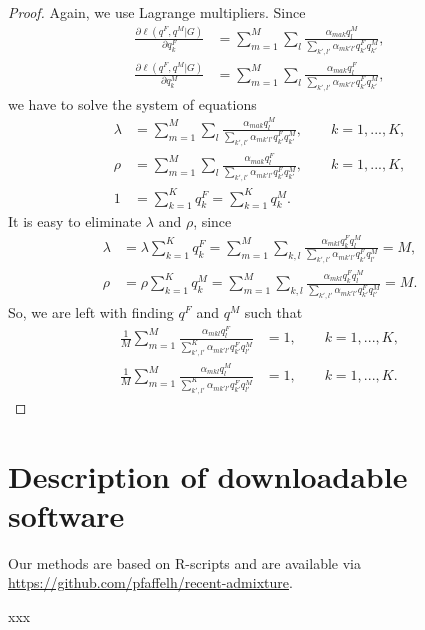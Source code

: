 \documentclass[12pt]{article}
\theoremstyle{definition}
\begin{document}
\begin{proof}
  Again, we use Lagrange multipliers. Since
  \begin{align*}
    \frac{\partial \ell(q^F, q^M|G)}{\partial q^F_k}
    & = \sum_{m=1}^M \sum_l \frac{\alpha_{mak}q_l^M}{\sum_{k',l'} \alpha_{mk'l'}q^F_{k'}q^M_{k'}},
    \\
    \frac{\partial \ell(q^F, q^M|G)}{\partial q^M_k}
    & = \sum_{m=1}^M \sum_l \frac{\alpha_{mak}q_l^F}{\sum_{k',l'} \alpha_{mk'l'}q^F_{k'}q^M_{k'}},
  \end{align*}
  we have to solve the system of equations
  \begin{align}\label{eq:1}
    \lambda & = \sum_{m=1}^M \sum_l \frac{\alpha_{mak}q_l^M}{\sum_{k',l'} \alpha_{mk'l'}q^F_{k'}q^M_{k'}}, \qquad k=1,...,K,\\
    \rho & = \sum_{m=1}^M \sum_l \frac{\alpha_{mak}q_l^F}{\sum_{k',l'} \alpha_{mk'l'}q^F_{k'}q^M_{k'}}, \qquad k=1,...,K,
    \\\label{eq:2}
    1 & = \sum_{k=1}^K q^F_k = \sum_{k=1}^K q^M_k.
  \end{align}
  It is easy to eliminate $\lambda$ and $\rho$, since
  \begin{align*}
    \lambda & = \lambda \sum_{k=1}^K q^F_k = \sum_{m=1}^M \sum_{k,l}
              \frac{\alpha_{mkl}q^F_kq_l^M}{\sum_{k',l'} \alpha_{mk'l'}q^F_{k'}q_{l'}^M} = M,
    \\
    \rho & = \rho \sum_{k=1}^K q_k^M = \sum_{m=1}^M \sum_{k,l}
           \frac{\alpha_{mkl}q^F_kq_l^M}{\sum_{k',l'} \alpha_{mk'l'}q^F_{k'}q_{l'}^M} = M.    
  \end{align*}
  So, we are left with finding $q^F$ and $q^M$ such that
  \begin{align}\label{eq:1}
    \frac{1}{M}\sum_{m=1}^M \frac{\alpha_{mkl}q_l^F}{\sum_{k',l'}^K \alpha_{mk'l'}q^F_{k'} q^M_{l'}} & = 1, \qquad k=1,...,K,
    \\ \frac{1}{M}\sum_{m=1}^M \frac{\alpha_{mkl}q_l^M}{\sum_{k',l'}^K \alpha_{mk'l'}q^F_{k'} q^M_{l'}} & = 1, \qquad k=1,...,K.
  \end{align}
\end{proof}

\section{Description of downloadable software}
Our methods are based on R-scripts and are available via \url{
  https://github.com/pfaffelh/recent-admixture}.

xxx
\end{document}
